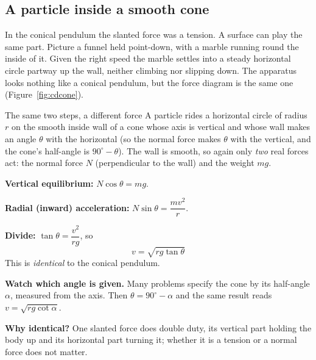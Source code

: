 \subsection{A particle inside a smooth cone}
In the conical pendulum the slanted force was a tension. A surface can play the same part. Picture a funnel held point-down, with a marble running round the inside of it. Given the right speed
the marble settles into a steady horizontal circle partway up the wall, neither climbing nor slipping
down. The apparatus looks nothing like a conical pendulum, but the force diagram is the same one
(Figure~\ref{fig:cdcone}).

\begin{figure}[htbp]
\centering
{}
\end{figure}

\begin{derivbox}{The same two steps, a different force}
A particle rides a horizontal circle of radius $r$ on the smooth inside wall of a cone whose axis is
vertical and whose wall makes an angle $\theta$ with the horizontal (so the normal force makes
$\theta$ with the vertical, and the cone's half-angle is $90^\circ-\theta$). The wall is smooth, so
again only \emph{two} real forces act: the normal force $N$ (perpendicular to the wall) and the
weight $mg$.

 \textbf{Vertical equilibrium:} $N\cos\theta=mg$.

 \textbf{Radial (inward) acceleration:} $N\sin\theta=\dfrac{mv^{2}}{r}$.

 \textbf{Divide:} $\tan\theta=\dfrac{v^{2}}{rg}$, so
\[
\boxed{\;v=\sqrt{rg\tan\theta}\;}
\]
This is \emph{identical} to the conical pendulum.

\smallskip
\textbf{Watch which angle is given.} Many problems specify the cone by its half-angle $\alpha$, measured
from the axis. Then $\theta=90^\circ-\alpha$ and the same result reads $v=\sqrt{rg\cot\alpha}$.

\smallskip
\textbf{Why identical?} One slanted force does double duty, its vertical part holding the body up
and its horizontal part turning it; whether it is a tension or a normal force does not matter.
\end{derivbox}

